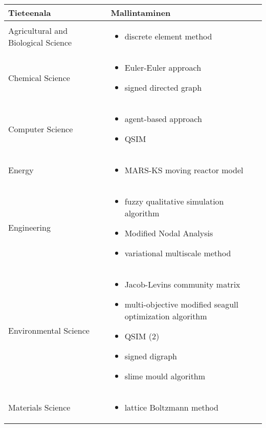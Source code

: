 \documentclass[utf8]{gradu3}
\begin{document}
\begin{longtable}[h]{|p{5cm}|p{8cm}|}
    \hline
    \textbf{Tieteenala}    &    \textbf{Mallintaminen}\\
    \hline
    Agricultural and Biological Science & \begin{itemize}
        \item discrete element method
    \end{itemize} \\
    \hline
    Chemical Science & \begin{itemize}
        \item Euler-Euler approach
        \item signed directed graph
    \end{itemize} \\
    \hline
    Computer Science & \begin{itemize}
        \item agent-based approach
        \item QSIM
    \end{itemize} \\
    \hline
    Energy & \begin{itemize}
        \item MARS-KS moving reactor model
    \end{itemize} \\
    \hline
    Engineering & \begin{itemize}
        \item fuzzy qualitative simulation algorithm
        \item Modified Nodal Analysis
        \item variational multiscale method
    \end{itemize} \\
    \hline
    Environmental Science & \begin{itemize}
        \item Jacob-Levins community matrix
        \item multi-objective modified seagull optimization algorithm
        \item QSIM (2)
        \item signed digraph
        \item slime mould algorithm
    \end{itemize} \\
    \hline
    Materials Science & \begin{itemize}
        \item lattice Boltzmann method

\end{itemize}
\end{longtable}
\end{document}
